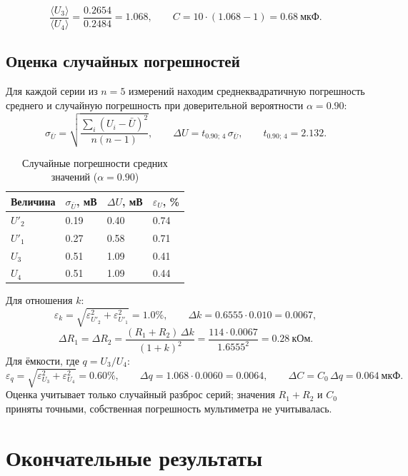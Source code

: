 \documentclass[12pt]{article}
\begin{document}
    \[
        \frac{\langle U_3 \rangle}{\langle U_4 \rangle} = \frac{0.2654}{0.2484} = 1.068, \qquad
        C = 10 \cdot (1.068 - 1) = 0.68 \ \text{мкФ}.
    \]

    \subsection{Оценка случайных погрешностей}

    Для каждой серии из $n = 5$ измерений находим среднеквадратичную погрешность среднего и случайную погрешность при доверительной вероятности $\alpha = 0.90$:
    \[
        \sigma_{\bar U} = \sqrt{\frac{\sum_i (U_i - \bar U)^2}{n(n - 1)}}, \qquad
        \varDelta U = t_{0.90;\,4}\,\sigma_{\bar U}, \qquad t_{0.90;\,4} = 2.132.
    \]

    \begin{table}[H]
        \centering
        \begin{xltabular}{\textwidth}{@{}lXXX@{}}
            \toprule
            Величина & $\sigma_{\bar U}$, мВ & $\varDelta U$, мВ & $\varepsilon_U$, \%\\
            \midrule
            $U'_2$ & 0.19 & 0.40 & 0.74 \\
            $U'_1$ & 0.27 & 0.58 & 0.71 \\
            $U_3$  & 0.51 & 1.09 & 0.41 \\
            $U_4$  & 0.51 & 1.09 & 0.44 \\
            \bottomrule
        \end{xltabular}
        \caption{Случайные погрешности средних значений ($\alpha = 0.90$)}
        \label{tab:err}
    \end{table}

    Для отношения $k$:
    \[
        \varepsilon_k = \sqrt{\varepsilon_{U'_2}^2 + \varepsilon_{U'_1}^2} = 1.0\%, \qquad \varDelta k = 0.6555 \cdot 0.010 = 0.0067,
    \]
    \[
        \varDelta R_1 = \varDelta R_2 = \frac{(R_1 + R_2)\,\varDelta k}{(1 + k)^2} = \frac{114 \cdot 0.0067}{1.6555^2} = 0.28 \ \text{кОм}.
    \]
    Для ёмкости, где $q = U_3 / U_4$:
    \[
        \varepsilon_{q} = \sqrt{\varepsilon_{U_3}^2 + \varepsilon_{U_4}^2} = 0.60\%, \qquad
        \varDelta q = 1.068 \cdot 0.0060 = 0.0064, \qquad \varDelta C = C_0\,\varDelta q = 0.064 \ \text{мкФ}.
    \]
    Оценка учитывает только случайный разброс серий; значения $R_1 + R_2$ и $C_0$ приняты точными, собственная погрешность мультиметра не учитывалась.

    \section{Окончательные результаты}
\end{document}
